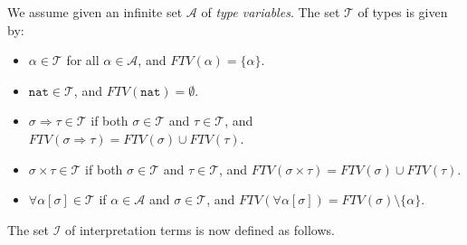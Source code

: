 \documentclass[runningheads,a4paper]{llncs}
\newcommand{\Iterms}{\mathcal{I}}
\newcommand{\Typevars}{\mathcal{A}}
\newcommand{\Types}{\mathcal{T}}
\newcommand{\quant}[2]{\forall #1[#2]}
\newcommand{\arrtype}{\Rightarrow}
\newcommand{\FTV}{\mathit{FTV}}
\newcommand{\nat}{\mathtt{nat}}
\begin{document}
\begin{definition}
We assume given an infinite set $\Typevars$ of \emph{type variables}.
The set $\Types$ of types is given by:
\begin{itemize}
\item $\alpha \in \Types$ for all $\alpha \in \Typevars$, and
  $\FTV(\alpha) = \{ \alpha \}$.
\item $\nat \in \Types$, and $\FTV(\nat) = \emptyset$.
\item $\sigma \arrtype \tau \in \Types$ if both $\sigma \in \Types$
  and $\tau \in \Types$, and $\FTV(\sigma \arrtype \tau) = \FTV(\sigma)
  \cup \FTV(\tau)$.
\item $\sigma \times \tau \in \Types$ if both $\sigma \in \Types$
  and $\tau \in \Types$, and $\FTV(\sigma \times \tau) = \FTV(\sigma)
  \cup \FTV(\tau)$.
\item $\quant{\alpha}{\sigma} \in \Types$ if $\alpha \in \Typevars$ and
  $\sigma \in \Types$, and $\FTV(\quant{\alpha}{\sigma}) =
  \FTV(\sigma) \setminus \{ \alpha \}$.
\end{itemize}
\end{definition}

The set $\Iterms$ of interpretation terms is now defined as follows.
\end{document}
